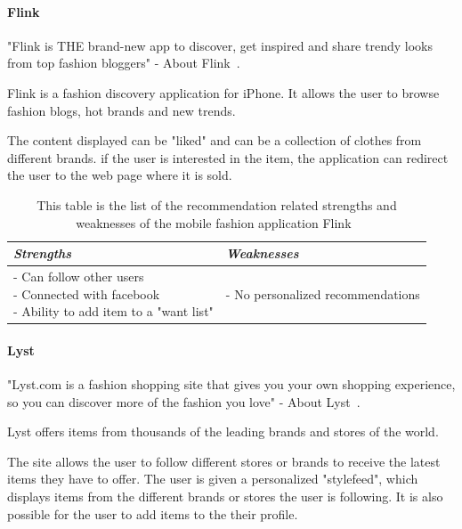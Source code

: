 \paragraph{Flink} %
\label{par:flink}
    "Flink is THE brand-new app to discover, get inspired and share trendy looks from top fashion bloggers" - About Flink~\cite{flink}.

    Flink is a fashion discovery application for iPhone.
    It allows the user to browse fashion blogs, hot brands and new trends.

    The content displayed can be "liked" and can be a collection of clothes from different brands.
    if the user is interested in the item, the application can redirect the user to the web page where it is sold.
    \begin{table}[H]
        \centering
        \begin{tabular}{l|l}
            \toprule
            \emph{Strengths} & \emph{Weaknesses} \\ \hline
            \pbox{9cm}{
                - Can follow other users \\
                - Connected with facebook \\
                - Ability to add item to a "want list"
            } & \pbox{9cm}{
                - No personalized recommendations \\
            } \\ \bottomrule
        \end{tabular}
        \caption[Recommendation related strengths and weaknesses of Flink~\cite{flink}]{This table is the list of the recommendation related strengths and weaknesses of the mobile fashion application Flink~\cite{flink}}
        \label{table:iphoneAppFlink}
    \end{table}

\paragraph{Lyst} %
\label{par:lyst}
    "Lyst.com is a fashion shopping site that gives you your own shopping experience, so you can discover more of the fashion you love" - About Lyst~\cite{lyst}.

    Lyst offers items from thousands of the leading brands and stores of the world.

    The site allows the user to follow different stores or brands to receive the latest items they have to offer.
    The user is given a personalized "stylefeed", which displays items from the different brands or stores the user is following.
    It is also possible for the user to add items to the their profile.

